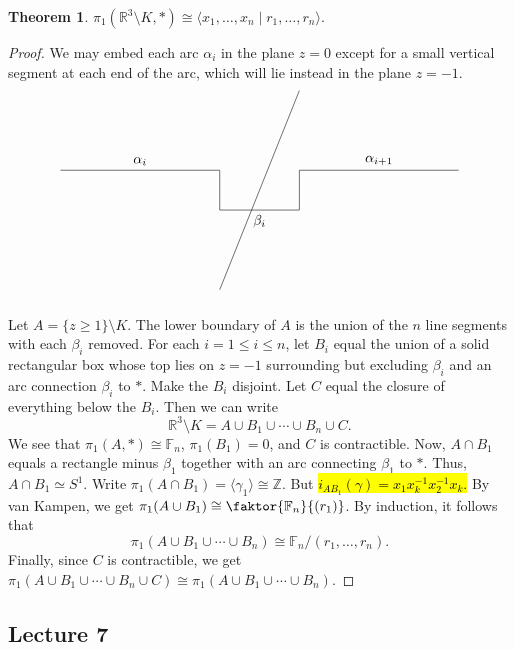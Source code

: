 \documentclass[10pt,letterpaper,cm]{nupset}
\theoremstyle{definition}
\theoremstyle{theorem}
\newtheorem{theorem}[definition]{Theorem}
\theoremstyle{remark}
\newcommand{\R}{\mathbb{R}}
\newcommand{\Z}{\mathbb Z}
\newcommand{\1}{\mathbb{1}}
\newcommand{\0}{\vec 0}
\begin{document}
\begin{theorem}
$\pi_1(\R^3 \setminus K, \ast) \cong \langle x_1, \ldots, x_n \mid r_1, \ldots, r_n \rangle$.
\end{theorem}
\begin{proof}
We may embed each arc $\alpha_i$ in the plane $z=0$ except for a small vertical segment at each end of the arc, which will lie instead in the plane $z={-1}$. 
\[
\begin{tikzpicture}
  \draw (0,1) node (nodeA) [below]  {} -- (4,1) node (nodeB) [above] {} node [midway, above, sloped] (EdgeAB) {$\alpha_i$} -- (4,0) node [below] (nodeC) {} node [midway, above, sloped] (EdgeBC) {} -- (6,0) node [above] (nodeD) {} node [midway, below, sloped] (EdgeCD) {$\beta_i$} -- (6,1) node (nodeE) [below]  {} -- (10,1) node (nodeF) [below]  {} node [midway, above, sloped] (EdgeEF) {$\alpha_{i+1}$} 
(4,-2) node (nodeG) [below]  {} --  (6,3) node (nodeH) [below]  {};
\end{tikzpicture}
\]
Let $A = \{z\geq 1 \}\setminus K$. 
The lower boundary of $A$ is  the union of the $n$ line segments with each $\beta_i$ removed. For each $i=1\leq i \leq n$, let $B_i$ equal the union of a solid rectangular box whose top lies on $z={-1}$ surrounding but excluding $\beta_i$ and an arc connection $\beta_i$ to $\ast$. Make the $B_i$ disjoint. Let $C$ equal the closure of everything below the $B_i$. 
Then  we can write $$\R^3 \setminus K = A \cup B_1 \cup \cdots \cup B_n \cup C.$$ We see that $\pi_1(A, \ast) \cong \mathbb{F}_n$, $\pi_1(B_1) =0$, and $C$ is contractible. Now, $A \cap B_1$ equals a rectangle minus $\beta_1$ together with an arc connecting $\beta_1$ to $\ast$. Thus, $A \cap B_1 \simeq S^1$. Write $\pi_1(A \cap B_1) = \langle \gamma_1 \rangle \cong \Z$. But \hl{$i_{AB_1}(\gamma) = x_1x_k^{-1}x_2^{-1}x_k$.} By van Kampen, we get $\pi_1(A \cup B_1) \cong \faktor{\mathbb{F}_n}{(r_1)}$. By induction, it follows that $$\pi_1(A \cup B_1 \cup \cdots \cup  B_n) \cong \mathbb{F}_n/(r_1, \ldots, r_n).$$ Finally, since $C$ is contractible, we get $\pi_1(A \cup B_1 \cup \cdots \cup  B_n \cup C) \cong \pi_1(A \cup B_1 \cup \cdots \cup  B_n).$
\end{proof}

\subsection{Lecture 7}
\end{document}
